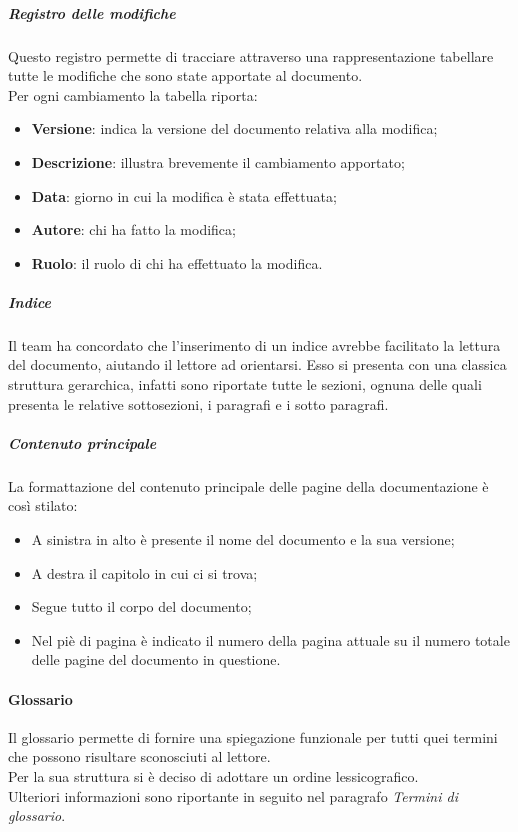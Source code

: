 \subparagraph{Registro delle modifiche}
Questo registro permette di tracciare attraverso una rappresentazione tabellare tutte le modifiche che sono state apportate al documento. \\
Per ogni cambiamento la tabella riporta:
\begin{itemize}
	\item\textbf{Versione}: indica la versione del documento relativa alla modifica;
	\item\textbf{Descrizione}: illustra brevemente il cambiamento apportato;
	\item\textbf{Data}: giorno in cui la modifica è stata effettuata;
	\item\textbf{Autore}: chi ha fatto la modifica;
	\item\textbf{Ruolo}: il ruolo di chi ha effettuato la modifica.
\end{itemize}

\subparagraph{Indice}
Il team ha concordato che l'inserimento di un indice avrebbe facilitato la lettura del documento, aiutando il lettore ad orientarsi.
Esso si presenta con una classica struttura gerarchica, infatti sono riportate tutte le sezioni, ognuna delle quali presenta le relative sottosezioni, i paragrafi e i sotto paragrafi.

\subparagraph{Contenuto principale}
La formattazione del contenuto principale delle pagine della documentazione è così stilato:
\begin{itemize}
	\item A sinistra in alto è presente il nome del documento e la sua versione;
	\item A destra il capitolo in cui ci si trova;
	\item Segue tutto il corpo del documento;
	\item Nel piè di pagina è indicato il numero della pagina attuale su il numero totale delle pagine del documento in questione. 
\end{itemize}

\paragraph{Glossario}
Il glossario permette di fornire una spiegazione funzionale per tutti quei termini che possono risultare sconosciuti al lettore.\\
Per la sua struttura si è deciso di adottare un ordine lessicografico.\\
Ulteriori informazioni sono riportante in seguito nel paragrafo \textit{Termini di glossario}.

